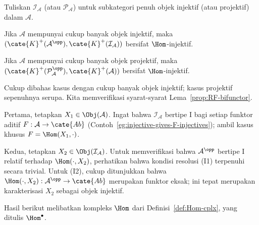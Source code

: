 \begin{lema}\label{prop:RHom-bounded-prep}
	Tuliskan $\mathcal{I}_{\mathcal{A}}$ (atau $\mathcal{P}_{\mathcal{A}}$)
untuk subkategori penuh objek injektif (atau projektif) dalam $\mathcal{A}$.
	\begin{compactitem}
		\item Jika $\mathcal{A}$ mempunyai cukup banyak objek injektif, maka
		$(\cate{K}^+(\mathcal{A}^{\opp}),
		\cate{K}^+(\mathcal{I}_{\mathcal{A}}))$ bersifat $\Hom$-injektif.
		\item Jika $\mathcal{A}$ mempunyai cukup banyak objek projektif, maka
		$(\cate{K}^+(\mathcal{P}_{\mathcal{A}}^{\opp}),
		\cate{K}^+(\mathcal{A}))$ bersifat $\Hom$-injektif.
	\end{compactitem}
\end{lema}
\begin{bukti}
	Cukup dibahas kasus dengan cukup banyak objek injektif; kasus projektif
	sepenuhnya serupa. Kita memverifikasi syarat-syarat
	Lema~\ref{prop:RF-bifunctor}.

	Pertama, tetapkan $X_1\in\Obj(\mathcal{A})$. Ingat bahwa
	$\mathcal{I}_{\mathcal{A}}$ bertipe I bagi setiap funktor aditif
	$F:\mathcal{A}\to\cate{Ab}$
(Contoh~\ref{eg:injective-gives-F-injectives}); ambil kasus khusus
$F=\Hom(X_1,\cdot)$.

	Kedua, tetapkan $X_2\in\Obj(\mathcal{I}_{\mathcal{A}})$. Untuk memverifikasi
	bahwa $\mathcal{A}^{\opp}$ bertipe I relatif terhadap $\Hom(\cdot,X_2)$,
	perhatikan bahwa kondisi resolusi (I1) terpenuhi secara trivial. Untuk (I2),
	cukup ditunjukkan bahwa
	$\Hom(\cdot,X_2):\mathcal{A}^{\opp}\to\cate{Ab}$ merupakan funktor eksak;
	ini tepat merupakan karakterisasi $X_2$ sebagai objek injektif.
\end{bukti}

Hasil berikut melibatkan kompleks $\Hom$ dari Definisi~\ref{def:Hom-cplx},
yang ditulis $\Hom^\bullet$.

